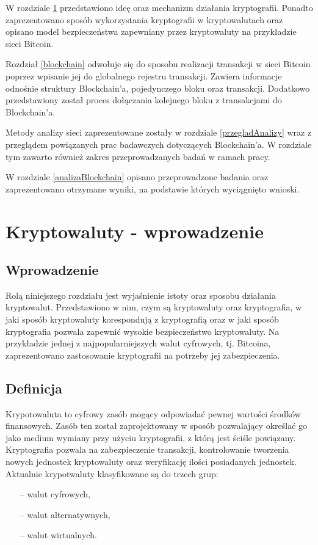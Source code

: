 \documentclass[12pt, oneside, final, openany]{mgr}
\begin{document}
\indent W rozdziale \ref{kryptowaulty} przedstawiono ideę oraz mechanizm działania kryptografii. Ponadto zaprezentowano sposób wykorzystania kryptografii w kryptowalutach oraz opisano model bezpieczeństwa zapewniany przez kryptowaluty na przykładzie sieci Bitcoin.

\indent Rozdział \ref{blockchain} odwołuje się do sposobu realizacji transakcji w sieci Bitcoin poprzez wpisanie jej do globalnego rejestru transakcji. Zawiera informacje odnośnie struktury Blockchain'a, pojedynczego bloku oraz transakcji. Dodatkowo przedstawiony został proces dołączania kolejnego bloku z transakcjami do Blockchain'a.

\indent Metody analizy sieci zaprezentowane zostały w rozdziale \ref{przegladAnalizy} wraz z przeglądem powiązanych prac badawczych dotyczących Blockchain'a. W rozdziale tym zawarto również zakres przeprowadzanych badań w ramach pracy.

\indent W rozdziale \ref{analizaBlockchain} opisano przeprowadzone badania oraz zaprezentowano otrzymane wyniki, na podstawie których wyciągnięto wnioski.

\chapter{Kryptowaluty - wprowadzenie}
\label{kryptowaulty}
\section{Wprowadzenie} 
\label{sec:KryptowalutyWprowadzenie}
\indent Rolą niniejszego rozdziału jest wyjaśnienie istoty oraz sposobu działania kryptowalut. Przedstawiono w nim, czym są kryptowaluty oraz kryptografia, w jaki sposób kryptowaluty korespondują z kryptografią oraz w jaki sposób kryptografia pozwala zapewnić wysokie bezpieczeństwo kryptowaluty. Na przykładzie jednej z najpopularniejszych walut cyfrowych, tj. Bitcoina, zaprezentowano zastosowanie kryptografii na potrzeby jej zabezpieczenia.

\section{Definicja} \label{sec:definicjaKryptowaluty}
\indent Krypotowaluta to cyfrowy zasób mogący odpowiadać pewnej wartości środków finansowych. Zasób ten został zaprojektowany w sposób pozwalający określać go jako medium wymiany przy użyciu kryptografii, z którą jest ściśle powiązany. Kryptografia pozwala na zabezpieczenie transakcji, kontrolowanie tworzenia nowych jednostek kryptowaluty oraz weryfikację ilości posiadanych jednostek. Aktualnie krypotwaluty klasyfikowane są do trzech grup:
\begin{itemize}
\item[--] walut cyfrowych,
\item[--] walut alternatywnych,
\item[--] walut wirtualnych.
\end{itemize}
\end{document}
